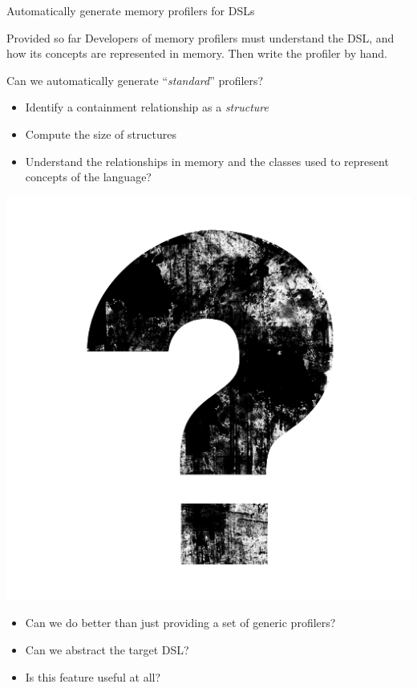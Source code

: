 \documentclass[10pt,xcolor={dvipsnames}]{beamer}
\begin{document}
	\begin{frame}{Automatically generate memory profilers for DSLs}
		\begin{block}{Provided so far}
			Developers of memory profilers must understand the DSL, and how its concepts are represented in memory. Then write the profiler by hand.
		\end{block}
		
		\begin{alertblock}{ Can we automatically generate ``\textit{standard}'' profilers? }
			\begin{itemize}
				\item Identify a containment relationship as a \textit{structure}
				\item Compute the size of structures
				\item Understand the relationships in memory and the classes used to represent concepts of the language?
			\end{itemize}
		\end{alertblock}
		
		\begin{alertblock}{\centering \includegraphics[scale=0.03]{fig/questions.png}}
			\begin{itemize}
				\item Can we do better than just providing a set of generic profilers?
				\item Can we abstract the target DSL?
				\item Is this feature useful at all? 
			\end{itemize}
		\end{alertblock}
		
	\end{frame}
\end{document}
